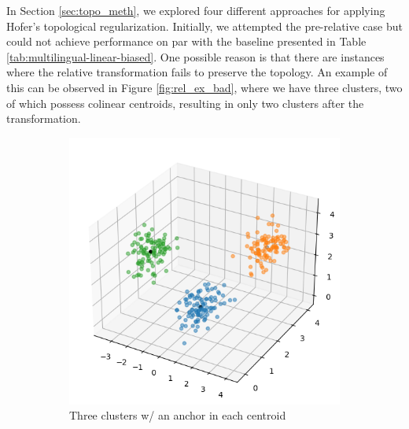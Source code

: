 \documentclass[../main.tex]{subfiles}
\begin{document}
In Section \ref{sec:topo_meth}, we explored four different approaches for applying Hofer's topological regularization. Initially, we attempted the pre-relative case but could not achieve performance on par with the baseline presented in Table \ref{tab:multilingual-linear-biased}. One possible reason is that there are instances where the relative transformation fails to preserve the topology. An example of this can be observed in Figure \ref{fig:rel_ex_bad}, where we have three clusters, two of which possess colinear centroids, resulting in only two clusters after the transformation.


\begin{figure}[ht!]
     \centering
    \begin{subfigure}[b]{0.45\textwidth}
         \centering
         \includegraphics[width=\textwidth]{figures/rs/stitching/clusters_1.png}
        \caption{Three clusters w/ an anchor in each centroid}
         \label{fig:rel_ex_1}
     \end{subfigure}\hfill
      \begin{subfigure}[b]{0.45\textwidth}
         \centering

\end{subfigure}
\end{figure}
\end{document}
